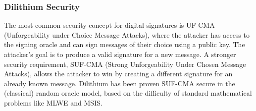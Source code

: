 \documentclass[lettersize,journal]{IEEEtran}
\begin{document}
\subsubsection{Dilithium Security}
The most common security concept for digital signatures is UF-CMA (Unforgeability under Choice Message Attacks), where the attacker has access to the signing oracle and can sign messages of their choice using a public key.
The attacker's goal is to produce a valid signature for a new message. 
A stronger security requirement, SUF-CMA (Strong Unforgeability Under Chosen Message Attacks), allows the attacker to win by creating a different signature for an already known message.
Dilithium has been proven SUF-CMA secure in the (classical) random oracle model, based on the difficulty of standard mathematical problems like MLWE and MSIS. 
\end{document}
